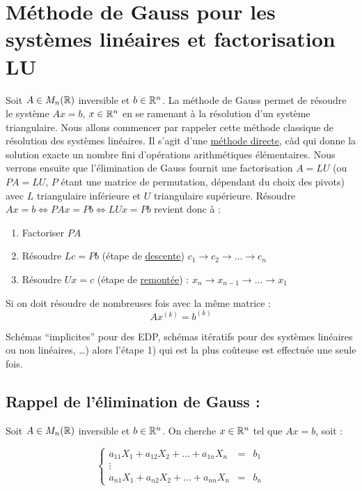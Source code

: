 \chapter{Méthode de Gauss pour les systèmes linéaires et factorisation LU}

Soit $A \in M_n(\mathbb{R})$ inversible et $b \in \mathbb{R}^n$. La méthode de Gauss permet de résoudre le système $Ax=b$, $x \in \mathbb{R}^n$ en se ramenant à la résolution d'un système triangulaire.
Nous allons commencer par rappeler cette méthode classique de résolution des systèmes linéaires. Il s'agit d'une \underline{méthode directe}, càd qui donne la solution exacte un nombre fini d'opérations arithmétiques élémentaires.
Nous verrons ensuite que l'élimination de Gauss fournit une factorisation $A = LU$ (ou $PA = LU$, $P$ étant une matrice de permutation, dépendant du choix des pivots)
avec $L$ triangulaire inférieure et $U$ triangulaire supérieure.
Résoudre $Ax=b \Leftrightarrow PAx = Pb \Leftrightarrow LUx = Pb$ revient donc à :

\begin{enumerate}
    \item Factoriser $PA$
    \item Résoudre $Lc = Pb$ (étape de \underline{descente}) $c_1 \to c_2 \to \dots \to c_n$
    \item Résoudre $Ux = c$ (étape de \underline{remontée}) : $x_n \to x_{n-1} \to \dots \to x_1$
\end{enumerate}

Si on doit résoudre de nombreuses fois avec la même matrice :
\[
    Ax^{(k)}=b^{(k)}
\]

Schémas ``implicites'' pour des EDP, schémas itératifs pour des systèmes linéaires ou non linéaires, \dots) alors l'étape 1) qui est la plus coûteuse est effectuée une seule fois.



\section{Rappel de l'élimination de Gauss :}

Soit $A \in M_n(\mathbb{R})$ inversible et $b \in \mathbb{R}^n$. On cherche $x \in \mathbb{R}^n$ tel que $Ax=b$, soit :

\begin{equation}
    \left\lbrace
    \begin{array}{ccc}
        a_{11}X_1 + a_{12}X_2+ \dots+ a_{1n}X_n & = & b_1 \\
        \vdots \\
        a_{n1}X_1 + a_{n2}X_2 + \dots + a_{nn}X_n & = & b_n
    \end{array}\right.
\end{equation}


